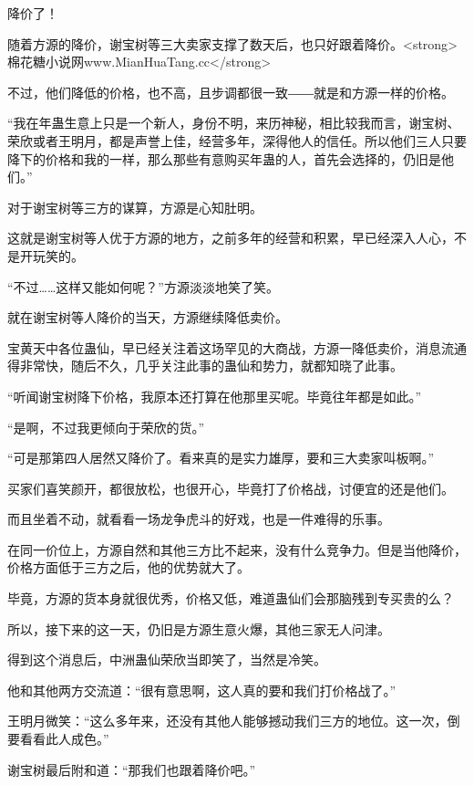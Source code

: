 
\begin{this_body}

降价了！

随着方源的降价，谢宝树等三大卖家支撑了数天后，也只好跟着降价。<strong>棉花糖小说网www.MianHuaTang.cc</strong>

不过，他们降低的价格，也不高，且步调都很一致――就是和方源一样的价格。

“我在年蛊生意上只是一个新人，身份不明，来历神秘，相比较我而言，谢宝树、荣欣或者王明月，都是声誉上佳，经营多年，深得他人的信任。所以他们三人只要降下的价格和我的一样，那么那些有意购买年蛊的人，首先会选择的，仍旧是他们。”

对于谢宝树等三方的谋算，方源是心知肚明。

这就是谢宝树等人优于方源的地方，之前多年的经营和积累，早已经深入人心，不是开玩笑的。

“不过……这样又能如何呢？”方源淡淡地笑了笑。

就在谢宝树等人降价的当天，方源继续降低卖价。

宝黄天中各位蛊仙，早已经关注着这场罕见的大商战，方源一降低卖价，消息流通得非常快，随后不久，几乎关注此事的蛊仙和势力，就都知晓了此事。

“听闻谢宝树降下价格，我原本还打算在他那里买呢。毕竟往年都是如此。”

“是啊，不过我更倾向于荣欣的货。”

“可是那第四人居然又降价了。看来真的是实力雄厚，要和三大卖家叫板啊。”

买家们喜笑颜开，都很放松，也很开心，毕竟打了价格战，讨便宜的还是他们。

而且坐着不动，就看看一场龙争虎斗的好戏，也是一件难得的乐事。

在同一价位上，方源自然和其他三方比不起来，没有什么竞争力。但是当他降价，价格方面低于三方之后，他的优势就大了。

毕竟，方源的货本身就很优秀，价格又低，难道蛊仙们会那脑残到专买贵的么？

所以，接下来的这一天，仍旧是方源生意火爆，其他三家无人问津。

得到这个消息后，中洲蛊仙荣欣当即笑了，当然是冷笑。

他和其他两方交流道：“很有意思啊，这人真的要和我们打价格战了。”

王明月微笑：“这么多年来，还没有其他人能够撼动我们三方的地位。这一次，倒要看看此人成色。”

谢宝树最后附和道：“那我们也跟着降价吧。”


\end{this_body}
